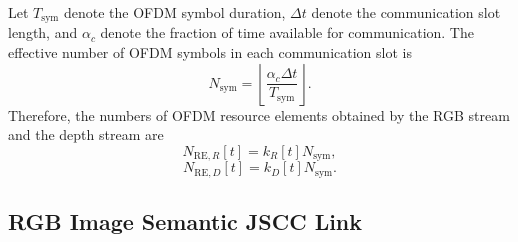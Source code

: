 \documentclass[journal]{IEEEtran}
\begin{document}
Let $T_{\mathrm{sym}}$ denote the OFDM symbol duration, $\Delta t$ denote the communication slot length, and $\alpha_c$ denote the fraction of time available for communication. The effective number of OFDM symbols in each communication slot is
\begin{equation}
N_{\mathrm{sym}}
=
\left\lfloor
\frac{
\alpha_c\Delta t
}
{
T_{\mathrm{sym}}
}
\right\rfloor.
\end{equation}
Therefore, the numbers of OFDM resource elements obtained by the RGB stream and the depth stream are
\begin{equation}
N_{\mathrm{RE},R}[t]
=
k_R[t]N_{\mathrm{sym}},
\end{equation}
\begin{equation}
N_{\mathrm{RE},D}[t]
=
k_D[t]N_{\mathrm{sym}}.
\end{equation}

\subsection{RGB Image Semantic JSCC Link}
\end{document}

